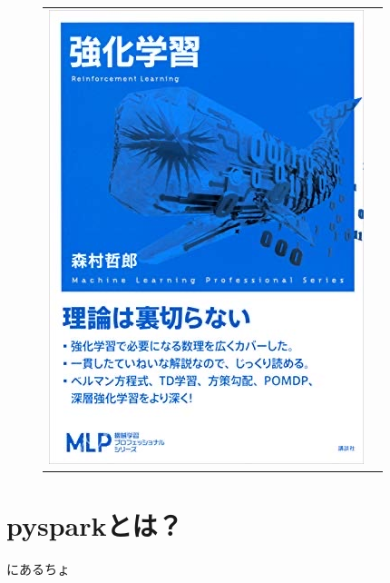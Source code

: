 \documentclass[aspectratio=169,dvipdfmx,xcolor=dvipsnames]{beamer}
\theoremstyle{definition}
\theoremstyle{definition}
\theoremstyle{definition}
\theoremstyle{definition}
\begin{document}
\begin{frame}
\begin{figure}
\begin{tabular}{cc}
\begin{minipage}{0.45\hsize}
        \includegraphics[scale=0.12]{morimura.png}
      \end{minipage}
    \end{tabular}
  \end{figure}

\end{frame}

\section*{pysparkとは？}

\begin{frame}
  \cite{noauthor_pyspark_nodate}にあるちょ
\end{frame}

\begin{frame}
  
  


\end{frame}
\end{document}
